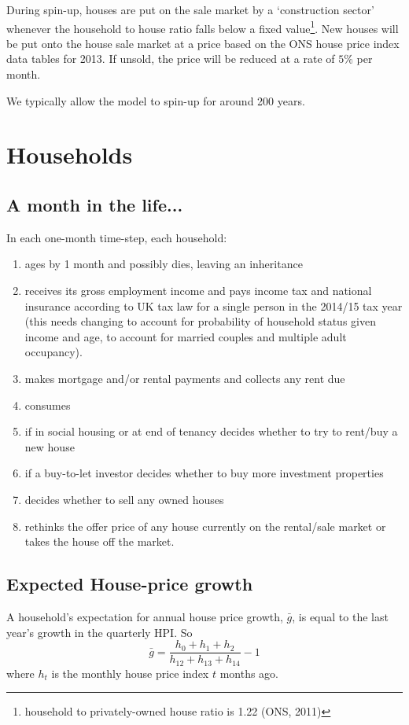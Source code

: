 \documentclass{report}
\begin{document}
During spin-up, houses are put on the sale market by a `construction sector' whenever the household to house ratio falls below a fixed value\footnote{household to privately-owned house ratio is 1.22 (ONS, 2011)}. New houses will be put onto the house sale market at a price based on the ONS house price index data tables for 2013. If unsold, the price will be reduced at a rate of $5\%$ per month.

We typically allow the model to spin-up for around 200 years.

\section{Households}

\subsection{A month in the life...}
In each one-month time-step, each household:
\begin{enumerate}
\item ages by 1 month and possibly dies, leaving an inheritance
\item receives its gross employment income and pays income tax and national insurance according to UK tax law for a single person in the 2014/15 tax year (this needs changing to account for probability of household status given income and age, to account for married couples and multiple adult occupancy).
\item makes mortgage and/or rental payments and collects any rent due
\item consumes
\item if in social housing or at end of tenancy decides whether to try to rent/buy a new house
\item if a buy-to-let investor decides whether to buy more investment properties
\item decides whether to sell any owned houses
\item rethinks the offer price of any house currently on the rental/sale market or takes the house off the market.
\end{enumerate}


\subsection{Expected House-price growth}
\label{housepricegrowth}
A household's expectation for annual house price growth, $\bar{g}$, is equal to the last year's growth in the quarterly HPI. So
\begin{equation}
\bar{g} = \frac{h_0 + h_{1} + h_{2}}{h_{12} + h_{13} + h_{14}} - 1
\end{equation}
where $h_t$ is the monthly house price index $t$ months ago.
\end{document}
